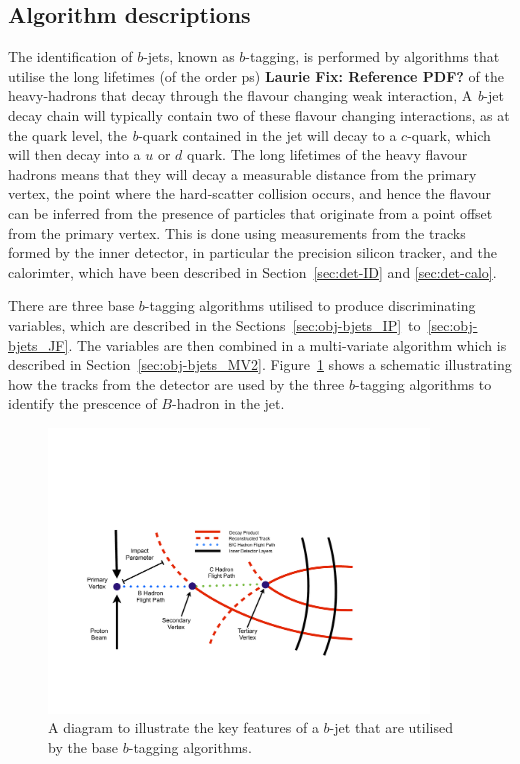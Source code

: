    \subsection{Algorithm descriptions}

   The identification of $b$-jets, known as $b$-tagging,
   is performed by algorithms that utilise the long lifetimes (of the order ps) \textbf{Laurie Fix: Reference PDF?}
   of the heavy-hadrons that decay through the flavour changing weak interaction,
   A \textit{b}-jet decay chain  will typically contain two of these flavour changing interactions, 
   as at the quark level, the \textit{b}-quark contained in the jet will decay to a $c$-quark, which will then decay into a $u$ or $d$ quark.
   The long lifetimes of the heavy flavour hadrons means that they will decay a measurable distance from the 
   primary vertex, the point where the hard-scatter collision occurs, and hence the flavour can be inferred from the presence of particles 
   that originate from a point offset from the primary vertex.
   This is done using measurements from the tracks formed by the inner detector, in particular the precision silicon tracker,
   and the calorimter, which have been described in Section~\ref{sec:det-ID} and \ref{sec:det-calo}.
   
   There are three base $b$-tagging algorithms utilised to produce discriminating variables, which are described in the Sections~\ref{sec:obj-bjets_IP}~to~\ref{sec:obj-bjets_JF}.
   The variables are then combined in a multi-variate algorithm which is described in Section~\ref{sec:obj-bjets_MV2}.
   Figure~\ref{fig:obj_bjet_schem} shows a schematic illustrating how the tracks from the detector
   are used by the three $b$-tagging algorithms
   to identify the prescence of $B$-hadron in the jet.
   
   \begin{figure}[!htb]
     \begin{center}
       \includegraphics[width=0.9\textwidth]{figs/Objects/bjet_schem.pdf}
       \caption{A diagram to illustrate the key features of a $b$-jet that are utilised by the base $b$-tagging algorithms.}
       \label{fig:obj_bjet_schem}
     \end{center}
     \vspace{-0.5cm}
   \end{figure}

